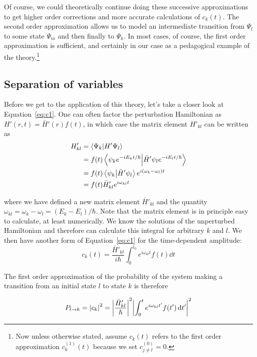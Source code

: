 Of course, we could theoretically continue doing these successive approximations to get higher order corrections and more accurate calculations of $c_k(t)$. The second order approximation allows us to model an intermediate transition from $\Psi_l$ to some state $\Psi_m$ and then finally to $\Psi_k$. In most cases, of course, the first order approximation is sufficient, and certainly in our case as a pedagogical example of the theory.\footnote{Now unless otherwise stated, assume $c_k(t)$ refers to the first order approximation $c_k^{(1)}(t)$ because we set $c^{(0)}_{j \neq l} = 0$.}


\subsection{Separation of variables}
Before we get to the application of this theory, let's take a closer look at Equation~\ref{eq:c1}. One can often factor the perturbation Hamiltonian as $H'(r,t) = \bar{H}'(r)f(t)$, in which case the matrix element $H'_{kl}$ can be written as
\begin{align*}
	H'_{kl} &= \braket{\Psi_k}{H'\Psi_l} \\
	&= f(t) \braket{\psi_ke^{-iE_kt/\hbar}}{\bar{H}'\psi_le^{-iE_lt/\hbar}} \\
	&= f(t) \braket{\psi_k}{\bar{H}'\psi_l}e^{i(\omega_k-\omega_l)t} \\
	&= f(t) \bar{H}'_{kl} e^{i\omega_{kl}t} 
\end{align*}

where we have defined a new matrix element $\bar{H}'_{kl}$ and the quantity $\omega_{kl} = \omega_k - \omega_l = (E_k - E_l)/\hbar$. Note that the matrix element is in principle easy to calculate, at least numerically. We know the solutions of the unperturbed Hamiltonian and therefore can calculate this integral for arbitrary $k$ and $l$. We then have another form of Equation~\ref{eq:c1} for the time-dependent amplitude:
\begin{equation}
	\boxed{c_k(t) = \frac{\bar{H}'_{kl}}{i\hbar} \int_{0}^{t_0} e^{i\omega_{kl}t} f(t) \dd{t}} \label{eq:c1-sep}
\end{equation}

The first order approximation of the probability of the system making a transition from an initial state $l$ to state $k$ is therefore
\begin{tcolorbox}[title = Transition probability] \vspace{-2ex}
	\begin{equation}
		P_{l \rightarrow k} = \abs{c_k}^2 = \abs{\frac{\bar{H}'_{kl}}{\hbar}}^2 \abs{\int_{0}^{t} e^{i\omega_{kl}t'} f(t') \dd{t'}}^2
	\end{equation}
\end{tcolorbox}

